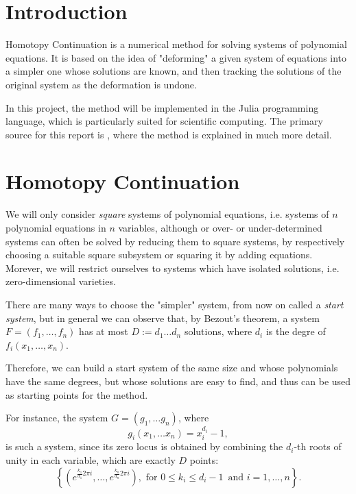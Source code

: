 \documentclass[a4paper]{article}
\theoremstyle{definition}
\theoremstyle{definition}
\theoremstyle{remark}
\theoremstyle{definition}
\begin{document}
\tableofcontents
\newpage

\section{Introduction}
Homotopy Continuation is a numerical method for solving systems of polynomial equations.
It is based on the idea of "deforming" a given system of equations into a simpler one whose
solutions are known, and then tracking the solutions of the original system as the deformation
is undone.

In this project, the method will be implemented in the Julia programming language, which is
particularly suited for scientific computing.
The primary source for this report is \cite{BertiniBook},
where the method is explained in much more detail.

\section{Homotopy Continuation}
We will only consider \textit{square} systems of polynomial equations, i.e. systems of $n$ polynomial equations in $n$ variables, although or over- or under-determined systems can
often be solved by reducing them to square systems, by respectively choosing a suitable square subsystem or squaring it by adding equations. Morever, we will restrict ourselves to
systems which have
isolated solutions, i.e. zero-dimensional varieties.

There are many ways to choose the "simpler" system, from now on called a \textit{start system}, but in general we can observe that, by Bezout's theorem, a system
$F=(f_1,\ldots,f_n)$ has at most $D:=d_1\ldots d_n$ solutions, where $d_i$ is the degre of $f_i(x_1,\ldots,x_n)$.

Therefore, we can build a start system of the same size and whose
polynomials have the same degrees, but whose solutions are easy to find, and thus can be used as starting points for the method.

For instance, the system $G=(g_1,\ldots g_n)$, where
$$ g_i(x_1,\ldots x_n)=x_i^{d_i}-1 ,$$
is such a system, since its zero locus is obtained by combining the $d_i$-th roots of unity in each variable, which are exactly $D$ points:
$$ \left\{\left(e^{\frac{k_1}{d_1}2\pi i},\ldots,e^{\frac{k_n}{d_n}2\pi i}\right),\text{ for }0\leq k_i\leq d_i-1\,\text{ and }i=1,\ldots,n\right\} .$$
\end{document}
